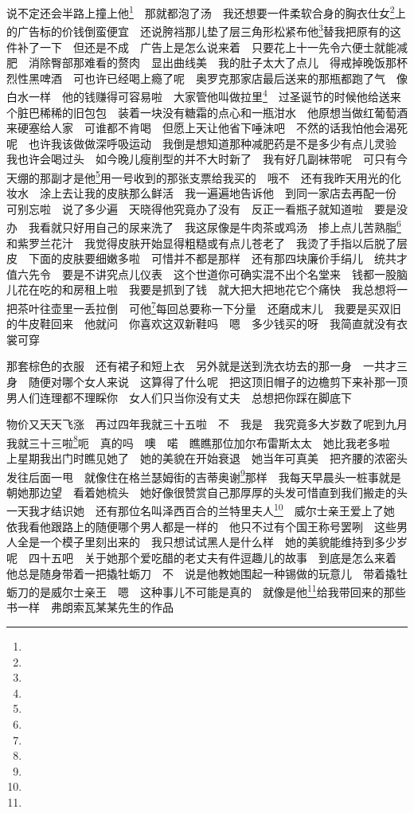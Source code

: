 \par 说不定还会半路上撞上他\footnote{}　那就都泡了汤　我还想要一件柔软合身的胸衣仕女\footnote{}上的广告标的价钱倒蛮便宜　还说胯裆那儿垫了层三角形松紧布他\footnote{}替我把原有的这件补了一下　但还是不成　广告上是怎么说来着　只要花上十一先令六便士就能减肥　消除臀部那难看的赘肉　显出曲线美　我的肚子太大了点儿　得戒掉晚饭那杯烈性黑啤酒　可也许已经喝上瘾了呢　奥罗克那家店最后送来的那瓶都跑了气　像白水一样　他的钱赚得可容易啦　大家管他叫做拉里\footnote{}　过圣诞节的时候他给送来个脏巴稀稀的旧包包　装着一块没有糖霜的点心和一瓶泔水　他原想当做红葡萄酒来硬塞给人家　可谁都不肯喝　但愿上天让他省下唾沫吧　不然的话我怕他会渴死呢　也许我该做做深呼吸运动　我倒是想知道那种减肥药是不是多少有点儿灵验　我也许会喝过头　如今晚儿瘦削型的并不大时新了　我有好几副袜带呢　可只有今天绷的那副才是他\footnote{}用一号收到的那张支票给我买的　哦不　还有我昨天用光的化妆水　涂上去让我的皮肤那么鲜活　我一遍遍地告诉他　到同一家店去再配一份　可别忘啦　说了多少遍　天晓得他究竟办了没有　反正一看瓶子就知道啦　要是没办　我看就只好用自己的尿来洗了　我这尿像是牛肉茶或鸡汤　掺上点儿苦熟脂\footnote{}和紫罗兰花汁　我觉得皮肤开始显得粗糙或有点儿苍老了　我烫了手指以后脱了层皮　下面的皮肤要细嫩多啦　可惜并不都是那样　还有那四块廉价手绢儿　统共才值六先令　要是不讲究点儿仪表　这个世道你可确实混不出个名堂来　钱都一股脑儿花在吃的和房租上啦　我要是抓到了钱　就大把大把地花它个痛快　我总想将一把茶叶往壶里一丢拉倒　可他\footnote{}每回总要称一下分量　还磨成末儿　我要是买双旧的牛皮鞋回来　他就问　你喜欢这双新鞋吗　嗯　多少钱买的呀　我简直就没有衣裳可穿　
\par 那套棕色的衣服　还有裙子和短上衣　另外就是送到洗衣坊去的那一身　一共才三身　随便对哪个女人来说　这算得了什么呢　把这顶旧帽子的边檐剪下来补那一顶　男人们连理都不理睬你　女人们只当你没有丈夫　总想把你踩在脚底下　
\par 物价又天天飞涨　再过四年我就三十五啦　不　我是　我究竟多大岁数了呢到九月我就三十三啦\footnote{}呃　真的吗　噢　喏　瞧瞧那位加尔布雷斯太太　她比我老多啦　上星期我出门时瞧见她了　她的美貌在开始衰退　她当年可真美　把齐腰的浓密头发往后面一甩　就像住在格兰瑟姆街的吉蒂奥谢\footnote{}那样　我每天早晨头一桩事就是朝她那边望　看着她梳头　她好像很赞赏自己那厚厚的头发可惜直到我们搬走的头一天我才结识她　还有那位名叫泽西百合的兰特里夫人\footnote{}　威尔士亲王爱上了她　依我看他跟路上的随便哪个男人都是一样的　他只不过有个国王称号罢咧　这些男人全是一个模子里刻出来的　我只想试试黑人是什么样　她的美貌能维持到多少岁呢　四十五吧　关于她那个爱吃醋的老丈夫有件逗趣儿的故事　到底是怎么来着　他总是随身带着一把撬牡蛎刀　不　说是他教她围起一种锡做的玩意儿　带着撬牡蛎刀的是威尔士亲王　嗯　这种事儿不可能是真的　就像是他\footnote{}给我带回来的那些书一样　弗朗索瓦某某先生的作品　
